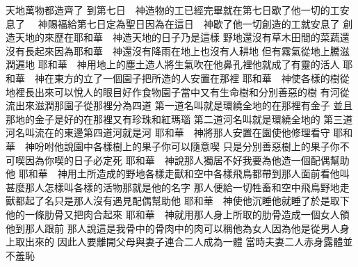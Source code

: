 \bchapter%
天地萬物都造齊了\chuan
{}到第七日\chientien 　神造物的工已經完畢\chientien 就在第七日歇了他一切的工\chientien 安息了\chuan 
{}　神賜福給第七日\chientien 定為聖日\chientien 因為在這日　神歇了他一切創造的工\chientien 就安息了\chuan\Chuan
{}創造天地的來歷\chientien 在耶和華　神造天地的日子\chientien 乃是這樣\yuentien 
{}野地還沒有草木\chientien 田間的菜蔬還沒有長起來\chientien 因為耶和華　神還沒有降雨在地上\chientien 也沒有人耕地\chuan 
{}但有霧氣從地上騰\chientien 滋潤遍地\chuan 
{}耶和華　神用地上的塵土造人\chientien 將生氣吹在他鼻孔裡\chientien 他就成了有靈的活人\chientien {}\chuan 
{}耶和華　神在東方的立了一個園子\chientien 把所造的人安置在那裡\chuan 
{}耶和華　神使各樣的樹從地裡長出來\chientien 可以悅人的眼目\chientien {}好作食物\yuentien 園子當中又有生命樹\chientien 和分別善惡的樹\chuan 
{}有河從流出來滋潤那園子\chientien 從那裡分為四道\chuan 
{}第一道名叫\chientien 就是環繞全地的\yuentien 在那裡有金子\chientien 
{}並且那地的金子是好的\yuentien 在那裡又有珍珠和紅瑪瑙\chuan 
{}第二道河名叫\chientien 就是環繞全地的\chuan 
{}第三道河名叫\chientien 流在的東邊\chuan 第四道河就是河\chuan 
{}耶和華　神將那人安置在園\chientien 使他修理看守\chuan 
{}耶和華　神吩咐他說\chientien 園中各樣樹上的果子\chientien 你可以隨意喫\yuentien 
{}只是分別善惡樹上的果子\chientien 你不可喫\chientien 因為你喫的日子必定死\chuan\Chuan
{}耶和華　神說\chientien 那人獨居不好\chientien 我要為他造一個配偶幫助他\chuan 
{}耶和華　神用土所造成的野地各樣走獸\chientien 和空中各樣飛鳥\chientien 都帶到那人面前看他叫甚麼\yuentien 那人怎樣叫各樣的活物\chientien 那就是他的名字\chuan 
{}那人便給一切牲畜\chientien 和空中飛鳥\chientien 野地走獸都起了名\yuentien 只是那人沒有遇見配偶幫助他\chuan 
{}耶和華　神使他沉睡\chientien 他就睡了\yuentien 於是取下他的一條肋骨\chientien 又把肉合起來\chuan 
{}耶和華　神就用那人身上所取的肋骨\chientien 造成一個女人\chientien 領他到那人跟前\chuan 
{}那人說\chientien 這是我骨中的骨\chientien 肉中的肉\chientien 可以稱他為女人\chientien 因為他是從男人身上取出來的\chuan 
{}因此\chientien 人要離開父母\chientien 與妻子連合\chientien 二人成為一體\chuan 
{}當時夫妻二人\chientien 赤身露體\chientien 並不羞恥\chuan 
